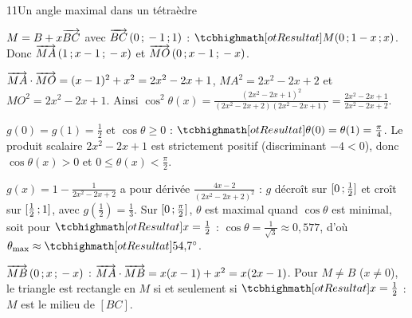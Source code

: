 \begin{corrige}{11}{Un angle maximal dans un tétraèdre}
\begin{questions}
  \item $M=B+x\overrightarrow{BC}$ avec $\overrightarrow{BC}\,(0\,{;}\,-1\,{;}\,1)$ : $\res{M(0\pv1-x\pv x)}$. Donc $\overrightarrow{MA}\,(1\,{;}\, x-1\,{;}\,-x)$ et
    $\overrightarrow{MO}\,(0\,{;}\, x-1\,{;}\,-x)$.
  \item $\overrightarrow{MA}\cdot\overrightarrow{MO}=(x-1)^2+x^2=2x^2-2x+1$, $MA^2=2x^2-2x+2$ et $MO^2=2x^2-2x+1$. Ainsi
    $\cos^2\theta(x)=\frac{(2x^2-2x+1)^2}{(2x^2-2x+2)(2x^2-2x+1)}=\frac{2x^2-2x+1}{2x^2-2x+2}$.
  \item $g(0)=g(1)=\frac12$ et $\cos\theta\geq0$ : $\res{\theta(0)=\theta(1)=\tfrac{\pi}{4}}$. Le produit scalaire
    $2x^2-2x+1$ est strictement positif (discriminant $-4<0$), donc $\cos\theta(x)>0$ et $0\leq\theta(x)<\frac\pi2$.
  \item $g(x)=1-\frac{1}{2x^2-2x+2}$ a pour dérivée $\frac{4x-2}{(2x^2-2x+2)^2}$ : $g$ décroît sur $\mathopen{[}0\,{;}\,\frac12\mathclose{]}$ et croît sur
    $\mathopen{[}\frac12\,{;}\,1\mathclose{]}$, avec $g\left(\frac12\right)=\frac13$. Sur $\mathopen{[}0\,{;}\,\frac\pi2\mathclose{]}$, $\theta$ est maximal quand $\cos\theta$ est minimal,
    soit pour $\res{x=\tfrac12}$ : $\cos\theta=\frac{1}{\sqrt3}\approx0{,}577$, d'où $\theta_{\max}\approx\res{54{,}7^\circ}$.
  \item $\overrightarrow{MB}\,(0\,{;}\, x\,{;}\,-x)$ : $\overrightarrow{MA}\cdot\overrightarrow{MB}=x(x-1)+x^2=x(2x-1)$. Pour $M\neq B$ ($x\neq0$), le triangle est rectangle
    en $M$ si et seulement si $\res{x=\tfrac12}$ : $M$ est le milieu de $[BC]$.
\end{questions}
\end{corrige}

